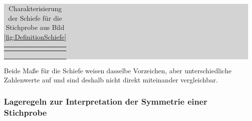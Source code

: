 \begin{table}[H]
\setlength{\arrayrulewidth}{.1em}
\caption{Charakterisierung der Schiefe f\"{u}r die Stichprobe aus Bild \ref{fig:DefinitionSchiefe}}
\setlength{\fboxsep}{0pt}%
\colorbox{lightgray}{%
%
\begin{tabular}{| c | c | c | c |}
\hline
\parbox[c][0.6in][c]{1.55in}{\smallskip\centering\textbf{\selectfont{Bild 3.10}}} & 
\parbox[c][0.6in][c]{1.55in}{\smallskip\centering\textbf{}} & 
\parbox[c][0.6in][c]{1.55in}{\smallskip\centering\textbf{}} & 
\parbox[c][0.6in][c]{1.55in}{\smallskip\centering\textbf{\selectfont{Folgerung für die Verteilung}}}\\ \hline

\parbox[c][0.3in][c]{1.55in}{\centering{}\selectfont{Links}} & 
\parbox[c][0.3in][c]{1.55in}{\centering{}\selectfont{1.1017}} & 
\parbox[c][0.3in][c]{1.55in}{\centering{}\selectfont{0.3333}} & 
\parbox[c][0.3in][c]{1.55in}{\centering{}\selectfont{Rechtsschief}}\\ \hline

\parbox[c][0.3in][c]{1.55in}{\centering{}\selectfont{Mitte}} & 
\parbox[c][0.3in][c]{1.55in}{\centering{}\selectfont{0}} & 
\parbox[c][0.3in][c]{1.55in}{\centering{}\selectfont{0}} & 
\parbox[c][0.3in][c]{1.55in}{\centering{}\selectfont{Symmetrisch}}\\ \hline

\parbox[c][0.3in][c]{1.55in}{\centering{}\selectfont{Rechts}} & 
\parbox[c][0.3in][c]{1.55in}{\centering{}\selectfont{- 1.1017}} & 
\parbox[c][0.3in][c]{1.55in}{\centering{}\selectfont{- 0.3333}} & 
\parbox[c][0.3in][c]{1.55in}{\centering{}\selectfont{Linksschief}}\\ \hline

\end{tabular}%
}
\label{tab:threeeightteen}
\end{table}

\noindent Beide Ma{\ss}e f\"{u}r die Schiefe weisen dasselbe Vorzeichen, aber unterschiedliche Zahlenwerte auf und sind deshalb nicht direkt miteinander vergleichbar.


\subsubsection{Lageregeln zur Interpretation der Symmetrie einer Stichprobe}

